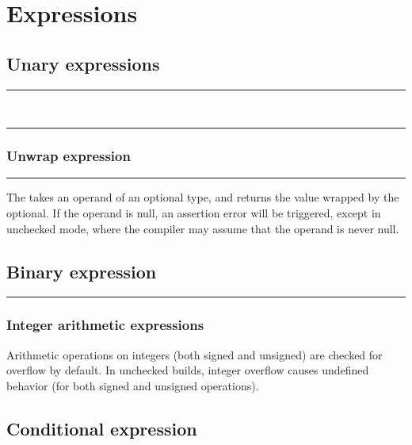 
\chapter{Expressions}

\section{Unary expressions}

\begin{grammar}
\rule{prefix-unary-expression}  \\
\rule{postfix-unary-expression}  
\end{grammar}

\subsection{Unwrap expression}

\begin{grammar}
\rule{unwrap-expression}  \code{!}
\end{grammar}

The  takes an operand of an optional type, and
returns the value wrapped by the optional. If the operand is null, an assertion
error will be triggered, except in unchecked mode, where the compiler may assume
that the operand is never null.

\section{Binary expression}

\begin{grammar}
\rule{binary-expression}   
\end{grammar}

\subsection{Integer arithmetic expressions}

Arithmetic operations on integers (both signed and unsigned) are checked for
overflow by default. In unchecked builds, integer overflow causes undefined
behavior (for both signed and unsigned operations).

\section{Conditional expression}


